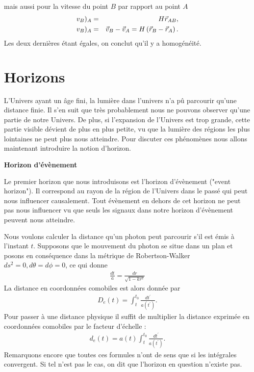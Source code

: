 \documentclass[a4paper,12pt]{report}
\theoremstyle{plain}
\theoremstyle{plain}
\begin{document}
      	mais aussi pour la vitesse du point $B$ par rapport au point $A$
      	\begin{eqnarray}
      	v_B ) _A &=&H\vec{r}_{AB} ,\cr
      	v_B ) _A &= &\vec{v}_B - \vec{v}_A =H\left( \vec{r}_B - \vec{r}_A\right). 
      	\end{eqnarray}
      	Les deux derni\`eres \'etant \'egales, on conclut qu'il y a homog\'en\'eit\'e.
    \section{Horizons} 
    
    L'Univers ayant un \^{a}ge fini, la lumi\`ere dans l'univers n'a p\^u parcourir qu'une distance finie. Il s'en suit que tr\`es probablement nous ne pouvons observer qu'une partie de notre Univers. De plus, si l'expansion de l'Univers est trop grande, cette partie visible d\'evient de plus en plus petite, vu que la lumi\`ere des r\'egions les plus lointaines ne peut plus nous atteindre. Pour discuter ces ph\'enom\`enes nous allons maintenant introduire la notion d'horizon. 

    \textbf{Horizon d'\'ev\`enement} 
    
     Le premier horizon  que nous introduisons est l'horizon d'\'ev\`enement ("event horizon"). Il correspond au rayon de la r\'egion de l'Univers dans le pass\'e qui peut nous influencer causalement. Tout \'ev\`enement en dehors de cet horizon ne peut pas nous influencer vu que seuls les signaux dans notre horizon d'\'ev\`enement peuvent nous atteindre. 
     
     
     Nous voulons calculer la distance qu'un photon peut parcourir s'il est \'emis \`a l'instant $t$. Supposons que le mouvement du photon se situe dans un plan et posons en cons\'equence dans la m\'etrique de Robertson-Walker $ds^2 =0 , d\theta =d \phi =0$, ce qui donne 
     \begin{eqnarray}
     \frac{dt}{a} = \frac{dr}{\sqrt{1-kr^2}} 
     \end{eqnarray}
     La distance en coordonn\'ees comobiles est alors donn\'ee par 
     \begin{eqnarray}
     D_e(t) = \displaystyle \int_{t}^{t_0} \frac{dt^\prime }{a(t^\prime )}. 
     \end{eqnarray}
 Pour passer \`a une distance physique il suffit de multiplier la distance exprim\'ee en coordonn\'ees comobiles par le facteur d'\'echelle : 
 \begin{eqnarray}
 d_e(t) =a(t) \displaystyle \int_{t}^{t_0} \frac{dt^\prime }{a(t^\prime )}.
 \end{eqnarray}
 Remarquons encore que toutes ces formules n'ont de sens que si les int\'egrales convergent. Si tel n'est pas le cas, on dit que l'horizon en question n'existe pas. 
 
\end{document}
